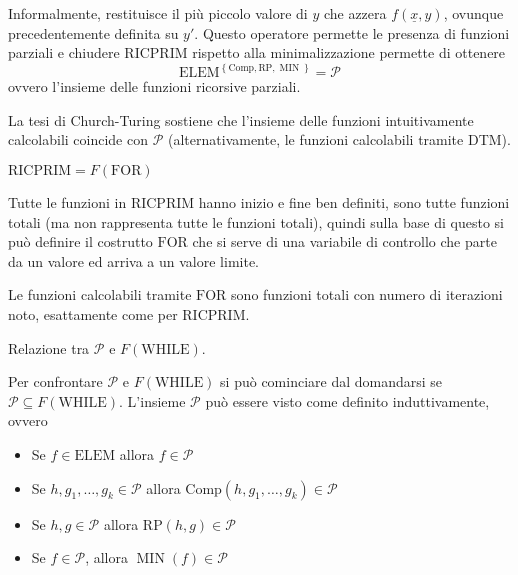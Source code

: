 \documentclass[12pt, answers]{exam}
\theoremstyle{plain}
\DeclareMathOperator{\MIN}{MIN}
\newcommand{\while}{\text{WHILE}}
\newcommand{\for}{\text{FOR}}
\newcommand{\elem}{\text{ELEM}}
\newcommand{\comp}{\text{Comp}}
\newcommand{\rp}{\text{RP}}
\newcommand{\ricprim}{\text{RICPRIM}}
\newcommand{\cp}{\mathcal{P}}
\begin{document}
\begin{questions}
\begin{solution}
            Informalmente, restituisce il più piccolo valore di $y$ che azzera $f(\underline x, y)$, ovunque precedentemente definita su $y'$. Questo operatore permette le presenza di funzioni parziali e chiudere $\ricprim$ rispetto alla minimalizzazione permette di ottenere
            $$ \elem^{\left\{\comp, \rp, \MIN\right\}} = \cp $$
            ovvero l'insieme delle funzioni ricorsive parziali.
        
            La tesi di Church-Turing sostiene che l'insieme delle funzioni intuitivamente calcolabili coincide con $\cp$ (alternativamente, le funzioni calcolabili tramite DTM).
        \end{solution}
        
        \question $\ricprim = F(\for)$
        
        \begin{solution}
            Tutte le funzioni in $\ricprim$ hanno inizio e fine ben definiti, sono tutte funzioni totali (ma non rappresenta tutte le funzioni totali), quindi sulla base di questo si può definire il costrutto $\for$ che si serve di una variabile di controllo che parte da un valore ed arriva a un valore limite. 
            
            Le funzioni calcolabili tramite $\for$ sono funzioni totali con numero di iterazioni noto, esattamente come per $\ricprim$.
        \end{solution}
        
        \question Relazione tra $\cp$ e $F(\while)$.
        
        \begin{solution}
            Per confrontare $\cp$ e $F(\while)$ si può cominciare dal domandarsi se $\cp \subseteq F(\while)$. L'insieme $\cp$ può essere visto come definito induttivamente, ovvero
            \begin{itemize}
                \item Se $f \in \elem$ allora $f \in \cp$
                
                \item Se $h, g_1, \dots, g_k \in \cp$ allora $\comp(h, g_1, \dots, g_k) \in \cp$
                
                \item Se $h, g \in \cp$ allora $\rp(h,g) \in \cp$ 
                
                \item Se $f \in \cp$, allora $\MIN (f) \in \cp$
            \end{itemize}
            

\end{solution}
\end{questions}
\end{document}
